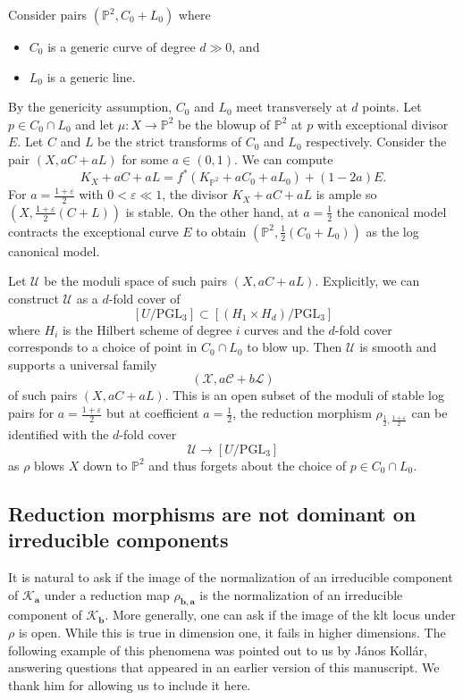\documentclass[11pt]{amsart}
\theoremstyle{definition}
\theoremstyle{remark}
\newcommand{\bP}{{\mathbb P}}
\newcommand{\calL}{\mathcal L}
\newcommand{\calU}{\mathcal U}
\newcommand{\calX}{\mathcal X}
\newcommand{\calC}{\mathcal C}
\newcommand{\sK}{\mathscr{K}}
\newcommand{\bfa}{\mathbf{a}}
\newcommand{\bfb}{\mathbf{b}}
\begin{document}
	
	Consider pairs $(\bP^2, C_0 + L_0)$ where
	\begin{itemize}
		\item $C_0$ is a generic curve of degree $d \gg 0$, and
		\item $L_0$ is a generic line. 
	\end{itemize}
	By the genericity assumption, $C_0$ and $L_0$ meet transversely at $d$ points. Let $p \in C_0 \cap L_0$ and let $\mu : X \to \bP^2$ be the blowup of $\bP^2$ at $p$ with exceptional divisor $E$. Let $C$ and $L$ be the strict transforms of $C_0$ and $L_0$ respectively. Consider the pair $(X, aC + aL)$ for some $a \in (0,1)$. We can compute
	\begin{equation}\label{eqn:disc}
		K_X + aC + aL = f^*(K_{\bP^2} + aC_0 + aL_0) + (1-2a)E.  
	\end{equation}
	For $a = \frac{1 + \varepsilon}{2}$ with $0 < \varepsilon \ll 1$, the divisor $K_X + aC + aL$ is ample so $\left(X, \frac{1 + \varepsilon}{2}(C + L)\right)$ is stable. On the other hand, at $a = \frac{1}{2}$ the canonical model contracts the exceptional curve $E$ to obtain $\left(\bP^2, \frac{1}{2}(C_0 + L_0)\right)$ as the log canonical model. 
	
	Let $\calU$ be the moduli space of such pairs $(X, aC + aL)$. Explicitly, we can construct $\calU$ as a $d$-fold cover of
	$$
	\left[U/\mathrm{PGL}_3\right] \subset \left[(H_1 \times H_d)/\mathrm{PGL}_3\right]
	$$
	where $H_i$ is the Hilbert scheme of degree $i$ curves and the $d$-fold cover corresponds to a choice of point in $C_0 \cap L_0$ to blow up. Then $\calU$ is smooth and supports a universal family
	$$
	\left(\calX, a\calC + b\calL\right)
	$$
	of such pairs $(X, aC + aL)$. This is an open subset of the moduli of stable log pairs for $a = \frac{1 + \varepsilon}{2}$ but at coefficient $a = \frac{1}{2}$, the reduction morphism $\rho_{\frac{1}{2}, \frac{1 + \varepsilon}{2}}$ can be identified with the $d$-fold cover
	$$
	\calU \to \left[U/\mathrm{PGL}_3\right]
	$$
	as $\rho$ blows $X$ down to $\bP^2$ and thus forgets about the choice of $p \in C_0\cap L_0$. 
	
	
	
	
	
	\subsection{Reduction morphisms are not dominant on irreducible components}\label{sec:JK}
	It is natural to ask if the image of the normalization of an irreducible component of $\sK_\bfa$ under a reduction map $\rho_{\bfb, \bfa}$ is the normalization of an irreducible component of $\sK_{\bfb}$. More generally, one can ask if the image of the klt locus under $\rho$ is open. While this is true in dimension one, it fails in higher dimensions. The following example of this phenomena was pointed out to us by J\'anos Koll\'ar, answering questions that appeared in an earlier version of this manuscript. We thank him for allowing us to include it here.
	
\end{document}
